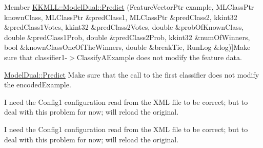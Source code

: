 \begin{DoxyRefList}
\hypertarget{todo__todo000009}{}%
Member \hyperlink{class_k_k_m_l_l_1_1_model_dual_a7fbbf876aa795e6628025d9ac60ed834}{K\+K\+M\+LL\+:\+:Model\+Dual\+:\+:Predict} (Feature\+Vector\+Ptr example, M\+L\+Class\+Ptr known\+Class, M\+L\+Class\+Ptr \&pred\+Class1, M\+L\+Class\+Ptr \&pred\+Class2, kkint32 \&pred\+Class1\+Votes, kkint32 \&pred\+Class2\+Votes, double \&prob\+Of\+Known\+Class, double \&pred\+Class1\+Prob, double \&pred\+Class2\+Prob, kkint32 \&num\+Of\+Winners, bool \&known\+Class\+One\+Of\+The\+Winners, double \&break\+Tie, Run\+Log \&log)]Make sure that \textquotesingle{}classifier1-\/$>$Classify\+A\+Example\textquotesingle{} does not modify the feature data.  
\item[\label{todo__todo000008}%
\hypertarget{todo__todo000008}{}%
Member \hyperlink{class_k_k_m_l_l_1_1_model_dual_a962c786e5b22cd2ab856f3554200cda3}{K\+K\+M\+LL\+:\+:Model\+Dual\+:\+:Predict} (Feature\+Vector\+Ptr example, Run\+Log \&log)]\hyperlink{class_k_k_m_l_l_1_1_model_dual_a962c786e5b22cd2ab856f3554200cda3}{Model\+Dual\+::\+Predict} Make sure that the call to the first classifier does not modify the encoded\+Example.  
\item[\label{todo__todo000010}%
\hypertarget{todo__todo000010}{}%
Member \hyperlink{class_k_k_m_l_l_1_1_model_dual_acd4989c89b05cea1d59eeea7e6b6a077}{K\+K\+M\+LL\+:\+:Model\+Dual\+:\+:Read\+X\+ML} (Xml\+Stream \&s, Xml\+Tag\+Const\+Ptr tag, Vol\+Const\+Bool \&cancel\+Flag, Run\+Log \&log)]I need the Config1 configuration read from the X\+ML file to be correct; but to deal with this problem for now; will reload the original. 

I need the Config1 configuration read from the X\+ML file to be correct; but to deal with this problem for now; will reload the original. 
\end{DoxyRefList}
